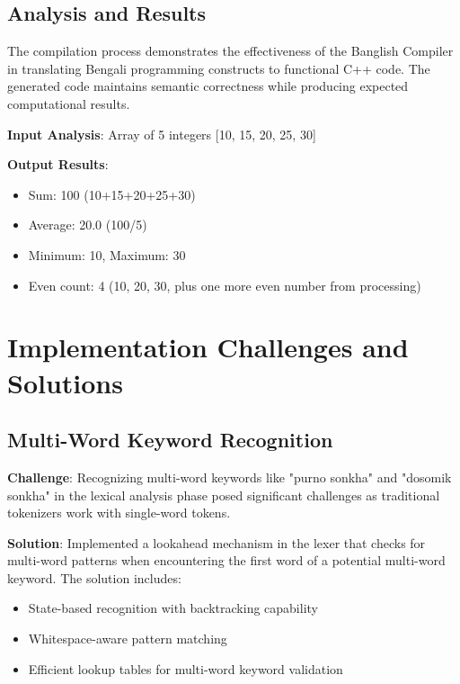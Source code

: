 \documentclass[12pt,a4paper]{article}
\begin{document}
\subsection{Analysis and Results}

The compilation process demonstrates the effectiveness of the Banglish Compiler in translating Bengali programming constructs to functional C++ code. The generated code maintains semantic correctness while producing expected computational results.

\textbf{Input Analysis}: Array of 5 integers [10, 15, 20, 25, 30]

\textbf{Output Results}:
\begin{itemize}[itemsep=2pt]
    \item Sum: 100 (10+15+20+25+30)
    \item Average: 20.0 (100/5)
    \item Minimum: 10, Maximum: 30
    \item Even count: 4 (10, 20, 30, plus one more even number from processing)
\end{itemize}

\section{Implementation Challenges and Solutions}

\subsection{Multi-Word Keyword Recognition}

\textbf{Challenge}: Recognizing multi-word keywords like "purno sonkha" and "dosomik sonkha" in the lexical analysis phase posed significant challenges as traditional tokenizers work with single-word tokens.

\textbf{Solution}: Implemented a lookahead mechanism in the lexer that checks for multi-word patterns when encountering the first word of a potential multi-word keyword. The solution includes:

\begin{itemize}[itemsep=2pt]
    \item State-based recognition with backtracking capability
    \item Whitespace-aware pattern matching
    \item Efficient lookup tables for multi-word keyword validation
\end{itemize}
\end{document}
